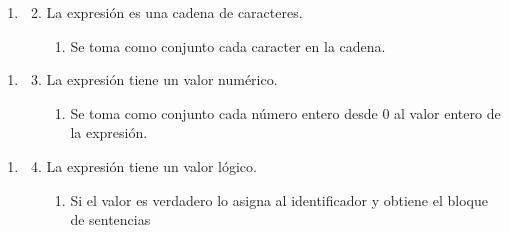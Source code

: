 \begin{framed}
\begin{description}
\begin{enumerate}
\begin {enumerate}
      \end{enumerate}
   \end{enumerate}
   \begin{enumerate} \itemsep1pt \parskip0pt 
   \setcounter{enumi}{2}
   \renewcommand{\labelenumi}{}
   \renewcommand{\labelenumiii}{\arabic{enumiii}.}
   \renewcommand{\labelenumii}{\arabic{enumi}\alph{enumii}.}
      \item 
      \begin {enumerate}
         \setcounter{enumii}{1}
         \item La expresión es una cadena de caracteres.
         \begin{enumerate}
         \item Se toma como conjunto cada caracter en la cadena.
         \end{enumerate}
      \end{enumerate}
   \end{enumerate}
   \begin{enumerate} \itemsep1pt \parskip0pt 
   \setcounter{enumi}{2}
   \renewcommand{\labelenumi}{}
   \renewcommand{\labelenumiii}{\arabic{enumiii}.}
   \renewcommand{\labelenumii}{\arabic{enumi}\alph{enumii}.}
      \item 
      \begin {enumerate}
         \setcounter{enumii}{2}
         \item La expresión tiene un valor numérico.
         \begin{enumerate}
         \item Se toma como conjunto cada número entero desde 0 al valor entero
         de la expresión.
         \end{enumerate}
      \end{enumerate}
   \end{enumerate}
   \begin{enumerate} \itemsep1pt \parskip0pt 
   \setcounter{enumi}{2}
   \renewcommand{\labelenumi}{}
   \renewcommand{\labelenumiii}{\arabic{enumiii}.}
   \renewcommand{\labelenumii}{\arabic{enumi}\alph{enumii}.}
      \item 
      \begin {enumerate}
         \setcounter{enumii}{3}
         \item La expresión tiene un valor lógico.
         \begin{enumerate}
         \item Si el valor es verdadero lo asigna al identificador y obtiene el bloque de sentencias

\end{enumerate}
\end{enumerate}
\end{enumerate}
\end{description}
\end{framed}
